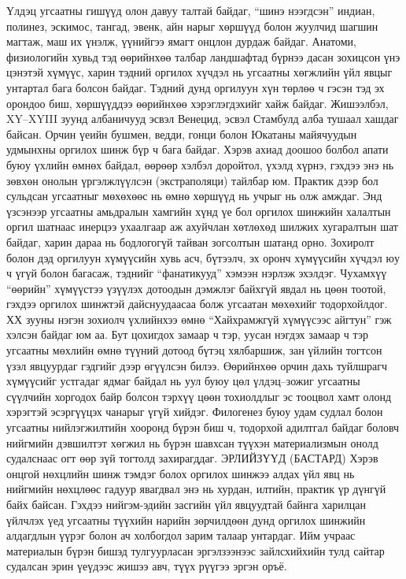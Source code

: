 Үлдэц угсаатны гишүүд олон давуу талтай байдаг, “шинэ нээгдсэн” индиан, полинез, эскимос, тангад, эвенк, айн нарыг хөршүүд болон жуулчид шагшин магтаж, маш их үнэлж, үүнийгээ ямагт онцлон дурдаж байдаг. Анатоми, физиологийн хувьд тэд өөрийнхөө талбар ландшафтад бүрнээ дасан зохицсон үнэ цэнэтэй хүмүүс, харин тэдний оргилох хүчдэл нь угсаатны хөгжлийн үйл явцыг унтартал бага болсон байдаг. Тэдний дунд оргилуун хүн төрлөө ч гэсэн тэд эх орондоо биш, хөршүүддээ өөрийнхөө хэрэглэгдэхийг хайж байдаг. Жишээлбэл, XY–XYIII зуунд албаничууд эсвэл Венецид, эсвэл Стамбулд алба тушаал хашдаг байсан. Орчин үеийн бушмен, ведди, гонци болон Юкатаны майячуудын удмынхны оргилох шинж бүр ч бага байдаг. Хэрэв ахиад доошоо болбол апати буюу үхлийн өмнөх байдал, өөрөөр хэлбэл доройтол, үхэлд хүрнэ, гэхдээ энэ нь зөвхөн онолын үргэлжлүүлсэн (экстраполяци) тайлбар юм. Практик дээр бол сульдсан угсаатныг мөхөхөөс нь өмнө хөршүүд нь учрыг нь олж амждаг.
Энд үзсэнээр угсаатны амьдралын хамгийн хүнд үе бол оргилох шинжийн халалтын оргил шатнаас инерцээ ухаалгаар аж ахуйчлан хөтлөхөд шилжих хугаралтын шат байдаг, харин дараа нь бодлогогүй тайван зогсолтын шатанд орно. Зохиролт болон дэд оргилуун хүмүүсийн хувь асч, бүтээлч, эх оронч хүмүүсийн хүчдэл юу ч үгүй болон багасаж, тэднийг “фанатикууд” хэмээн нэрлэж эхэлдэг. Чухамхүү “өөрийн” хүмүүстээ үзүүлэх дотоодын дэмжлэг байхгүй явдал нь цөөн тоотой, гэхдээ оргилох шинжтэй дайснуудаасаа болж угсаатан мөхөхийг тодорхойлдог. ХХ зууны нэгэн зохиолч үхлийнхээ өмнө “Хайхрамжгүй хүмүүсээс айгтун” гэж хэлсэн байдаг юм аа.
Бут цохигдох замаар ч тэр, уусан нэгдэх замаар ч тэр угсаатны мөхлийн өмнө түүний дотоод бүтэц хялбаршиж, зан үйлийн тогтсон үзэл явцуурдаг гэдгийг дээр өгүүлсэн билээ. Өөрийнхөө орчин дахь туйлшрагч хүмүүсийг устгадаг ядмаг байдал нь уул буюу цөл үлдэц–зожиг угсаатны сүүлчийн хоргодох байр болсон тэрхүү цөөн тохиолдлыг эс тооцвол хамт олонд хэрэгтэй эсэргүүцэх чанарыг үгүй хийдэг. Филогенез буюу удам судлал болон угсаатны нийлэгжилтийн хооронд бүрэн биш ч, тодорхой адилтгал байдаг боловч нийгмийн дэвшилтэт хөгжил нь бүрэн шавхсан түүхэн материализмын онолд судалснаас огт өөр зүй тогтолд захирагддаг.
ЭРЛИЙЗҮҮД (БАСТАРД)
Хэрэв онцгой нөхцлийн шинж тэмдэг болох оргилох шинжээ алдах үйл явц нь нийгмийн нөхцлөөс гадуур явагдвал энэ нь хурдан, илтийн, практик үр дүнгүй байх байсан. Гэхдээ нийгэм-эдийн засгийн үйл явцуудтай байнга харилцан үйлчлэх үед угсаатны түүхийн нарийн зөрчилдөөн дунд оргилох шинжийн алдагдлын үүрэг болон ач холбогдол зарим талаар унтардаг. Ийм учраас материалын бүрэн бишэд тулгуурласан эргэлзээнээс зайлсхийхийн тулд сайтар судалсан эрин үеүдээс жишээ авч, түүх рүүгээ эргэн оръё.
